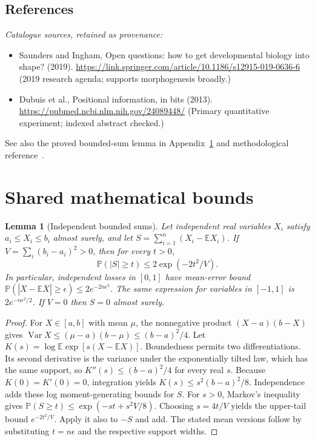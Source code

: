 \documentclass[11pt]{article}
\newcommand{\E}{\mathbb E}
\newcommand{\Prob}{\mathbb P}
\DeclareMathOperator{\Var}{Var}
\providecommand{\E}{\mathbb E}
\providecommand{\Prob}{\mathbb P}
\providecommand{\Var}{\operatorname{Var}}
\newtheorem{sharedlemma}{Lemma}[section]
\begin{document}
\subsection{References}
\noindent\emph{Catalogue sources, retained as provenance:}
\begin{itemize}
\item Saunders and Ingham, Open questions: how to get developmental biology into shape? (2019). \url{https://link.springer.com/article/10.1186/s12915-019-0636-6} (2019 research agenda; supports morphogenesis broadly.)
\item Dubuis et al., Positional information, in bits (2013). \url{https://pubmed.ncbi.nlm.nih.gov/24089448/} (Primary quantitative experiment; indexed abstract checked.)
\end{itemize}
\noindent See also the proved bounded-sum lemma in Appendix~\ref{app:bounds} and methodological reference~\cite{hoeffding}.
\clearpage


\appendix
\section{Shared mathematical bounds}\label{app:bounds}
\begin{sharedlemma}[Independent bounded sums]\label{lem:bounded}
Let independent real variables $X_i$ satisfy $a_i\leq X_i\leq b_i$ almost surely,
and let $S=\sum_{i=1}^n(X_i-\E X_i)$. If
$V=\sum_i(b_i-a_i)^2>0$, then for every $t>0$,
\[
 \Prob(|S|\geq t)\leq 2\exp(-2t^2/V).
\]
In particular, independent losses in $[0,1]$ have mean-error bound
$\Prob(|\overline X-\E\overline X|\geq\epsilon)
\leq2e^{-2n\epsilon^2}$. The same expression for variables in $[-1,1]$
is $2e^{-n\epsilon^2/2}$. If $V=0$ then $S=0$ almost surely.
\end{sharedlemma}
\begin{proof}
For $X\in[a,b]$ with mean $\mu$, the nonnegative product
$(X-a)(b-X)$ gives
$\Var X\leq(\mu-a)(b-\mu)\leq(b-a)^2/4$.
Let $K(s)=\log\E\exp[s(X-\E X)]$.
Boundedness permits two differentiations. Its second derivative is the variance
under the exponentially tilted law, which has the same support, so
$K''(s)\leq(b-a)^2/4$ for every real $s$.
Because $K(0)=K'(0)=0$, integration yields
$K(s)\leq s^2(b-a)^2/8$.
Independence adds these log moment-generating bounds for $S$.
For $s>0$, Markov's inequality gives
$\Prob(S\geq t)\leq\exp(-st+s^2V/8)$.
Choosing $s=4t/V$ yields the upper-tail bound $e^{-2t^2/V}$.
Apply it also to $-S$ and add. The stated mean versions follow by substituting
$t=n\epsilon$ and the respective support widths.
\end{proof}
\end{document}
